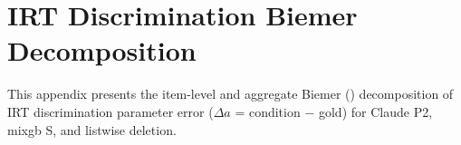 \documentclass[
  man,
  floatsintext,
  longtable,
  nolmodern,
  notxfonts,
  notimes,
  colorlinks=true,linkcolor=blue,citecolor=blue,urlcolor=blue]{apa7}
\begin{document}
\section{IRT Discrimination Biemer
Decomposition}\label{apx-discrim-biemer}

This appendix presents the item-level and aggregate Biemer
() decomposition of IRT discrimination
parameter error (\(\Delta a\) = condition \(-\) gold) for Claude P2,
mixgb S, and listwise deletion.

\begin{table}
\caption{Item-Level Biemer Decomposition of IRT Discrimination --- Claude P2 and
mixgb S vs Gold Standard. Bias = mean \(\Delta a\) across 5 folds. MSE =
Bias\(^2\) + Variance.}\tabularnewline

\centering\begingroup\fontsize{9}{11}\selectfont


\end{table}
\end{document}
